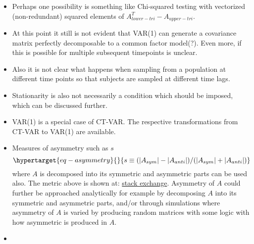 \documentclass[
  letterpaper,
  DIV=11,
  numbers=noendperiod]{scrartcl}
\let\oldparagraph\paragraph
\renewcommand{\paragraph}[1]{\oldparagraph{#1}\mbox{}}
\providecommand{\tightlist}{%
  \setlength{\itemsep}{0pt}\setlength{\parskip}{0pt}}\usepackage{longtable,booktabs,array}
\begin{document}
\begin{itemize}
\tightlist
\item
  Perhaps one possibility is something like Chi-squared testing with
  vectorized (non-redundant) squared elements of
  \(A_{lower-tri}^T-A_{upper-tri}\).
\item
  At this point it still is not evident that VAR(1) can generate a
  covariance matrix perfectly decomposable to a common factor model(?).
  Even more, if this is possible for multiple subsequent timepoints is
  unclear.
\item
  Also it is not clear what happens when sampling from a population at
  different time points so that subjects are sampled at different time
  lags.
\item
  Stationarity is also not necessarily a condition which should be
  imposed, which can be discussed further.
\item
  VAR(1) is a special case of CT-VAR. The respective transformations
  from CT-VAR to VAR(1) are available.
\item
  Measures of asymmetry such as \(s\)
  \begin{equation}\protect\hypertarget{eq-asymmetry}{}{
  s \equiv (|A_{sym}|-|A_{anti}|)/(|A_{sym}|+|A_{anti}|)
  }\label{eq-asymmetry}\end{equation} where \(A\) is decomposed into its
  symmetric and asymmetric parts can be used also. The metric above is
  shown at:
  \href{https://math.stackexchange.com/questions/2048817/metric-for-how-symmetric-a-matrix-is}{stack
  exchange}. Asymmetry of \(A\) could further be approached analytically
  for example by decomposing \(A\) into its symmetric and asymmetric
  parts, and/or through simulations where asymmetry of \(A\) is varied
  by producing random matrices with some logic with how asymmetric is
  produced in \(A\).
\item
\end{itemize}

\hypertarget{section}{%
\paragraph{}\label{section}}
\end{document}
